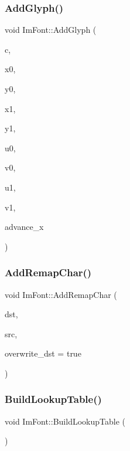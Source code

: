\subsubsection{\texorpdfstring{Add\+Glyph()}{AddGlyph()}}
{\footnotesize\ttfamily void Im\+Font\+::\+Add\+Glyph (\begin{DoxyParamCaption}\item[{Im\+Wchar}]{c,  }\item[{float}]{x0,  }\item[{float}]{y0,  }\item[{float}]{x1,  }\item[{float}]{y1,  }\item[{float}]{u0,  }\item[{float}]{v0,  }\item[{float}]{u1,  }\item[{float}]{v1,  }\item[{float}]{advance\+\_\+x }\end{DoxyParamCaption})}

\hypertarget{struct_im_font_aba8cd20f14ba47175d45d3f2063aa329}{}\label{struct_im_font_aba8cd20f14ba47175d45d3f2063aa329} 
\subsubsection{\texorpdfstring{Add\+Remap\+Char()}{AddRemapChar()}}
{\footnotesize\ttfamily void Im\+Font\+::\+Add\+Remap\+Char (\begin{DoxyParamCaption}\item[{Im\+Wchar}]{dst,  }\item[{Im\+Wchar}]{src,  }\item[{bool}]{overwrite\+\_\+dst = {\ttfamily true} }\end{DoxyParamCaption})}

\hypertarget{struct_im_font_a04b3a1437bd0032722bbbd3613941162}{}\label{struct_im_font_a04b3a1437bd0032722bbbd3613941162} 
\subsubsection{\texorpdfstring{Build\+Lookup\+Table()}{BuildLookupTable()}}
{\footnotesize\ttfamily void Im\+Font\+::\+Build\+Lookup\+Table (\begin{DoxyParamCaption}{ }\end{DoxyParamCaption})}


